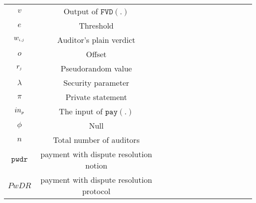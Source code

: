 \begin{table}[!htbp]
\begin{scriptsize}
\begin{center}
{{\begin{tabular}{|c|c|c|c|c|c|c|c|c|c|c|c|c|c|}
%
\cellcolor{gray!20}\scriptsize$v$ &\cellcolor{gray!20}\scriptsize  Output of $\mathtt{FVD}(.)$\\ 
%
\cellcolor{white!20}\scriptsize$e$ &\cellcolor{white!20}\scriptsize  Threshold\\ 
%            
 \cellcolor{gray!20}\scriptsize$w_{\scriptscriptstyle i,j}$ &\cellcolor{gray!20}\scriptsize  Auditor's plain verdict\\ 
%     
\cellcolor{white!20}\scriptsize$o$ &\cellcolor{white!20}\scriptsize  Offset\\  
  \cellcolor{gray!20}\scriptsize$r_{\scriptscriptstyle j}$ &\cellcolor{gray!20}\scriptsize  Pseudorandom value\\   
\cellcolor{white!20}\scriptsize$\lambda$ &\cellcolor{white!20}\scriptsize Security parameter\\  
%


                
%
\cellcolor{gray!20}\scriptsize$\pi$ &\cellcolor{gray!20}\scriptsize Private statement\\        
\cellcolor{white!20}\scriptsize$in_{\scriptscriptstyle p}$ &\cellcolor{white!20}\scriptsize The input of $\mathtt{pay}(.)$\\    
%
\cellcolor{gray!20}\scriptsize$\phi$ &\cellcolor{gray!20}\scriptsize  Null\\ 
%
\cellcolor{white!20}\scriptsize$n$ &\cellcolor{white!20}\scriptsize  Total number of auditors\\  
%           
%
%

\cellcolor{gray!20}\scriptsize$\mathtt{pwdr}$ &\cellcolor{gray!20}\scriptsize  payment with dispute resolution notion\\ 
%
\cellcolor{white!20}\scriptsize$PwDR$ &\cellcolor{white!20}\scriptsize  payment with dispute resolution protocol\\ 
\hline 

      

           
              
\end{tabular}\label{table:notation-table}
%
}
}
\end{center}
\end{scriptsize}
\end{table}








